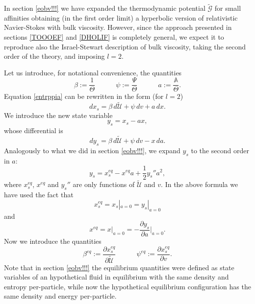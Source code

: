 \documentclass[useAMS,usenatbib,prd,twocolumn,nofootinbib]{revtex4-1}
\newcommand{\spc}{\quad \quad \quad}
\begin{document}
In section \ref{eobv!!!} we have expanded the thermodynamic potential $\tilde{\mathcal{G}}$ for small affinities obtaining (in the first order limit) a hyperbolic version of relativistic Navier-Stokes with bulk viscosity. 
However, since the approach presented in sections \ref{TOOOEF} and \ref{DHOLIF} is completely general, we expect it  to reproduce also the Israel-Stewart description of bulk viscosity, taking the second order of the theory, and imposing $l=2$.

Let us introduce, for notational convenience, the quantities
\begin{equation}\label{def...iciente}
\beta := \dfrac{1}{\Theta}  \spc  \psi := \dfrac{\Psi}{\Theta}  \spc  a := \dfrac{\mathbb{A}}{\Theta} .
\end{equation}
Equation \eqref{entrppia} can be rewritten in the form (for $l=2$)
\begin{equation}\label{entrppia111}
dx_s = \beta \, d\tilde{\mathcal{U}} + \psi \, d v +  a \, dx .
\end{equation}
We introduce the new state variable 
\begin{equation}\label{legg333}
y_s = x_s -ax ,
\end{equation}
whose differential is
\begin{equation}\label{54321}
dy_s = \beta \, d\tilde{\mathcal{U}} + \psi \, d v -  x \, da .
\end{equation}
Analogously to what we did in section \ref{eobv!!!}, we expand $y_s$ to the second order in $a$:
\begin{equation}\label{9876}
y_s = x_s^{eq} - x^{eq} a +\dfrac{1}{2} y_s'' a^2 , 
\end{equation}
where $x_s^{eq}$, $x^{eq}$ and $y_s''$ are only functions of $\tilde{\mathcal{U}}$ and $v$. In the above formula we have used the fact that
\begin{equation}
x_s^{eq} = x_s|_{a=0} = y_s|_{a=0}
\end{equation}
and
\begin{equation}
x^{eq} = x|_{a=0} = -\dfrac{\partial y_s}{\partial a} \bigg|_{a=0} .
\end{equation}
Now we introduce the quantities
\begin{equation}
\beta^{eq} := \dfrac{\partial x_s^{eq}}{\partial \tilde{\mathcal{U}}}  \spc  \psi^{eq} := \dfrac{\partial x_s^{eq}}{\partial v} .
\end{equation}
Note that in section \ref{eobv!!!} the equilibrium quantities were defined as state variables of an hypothetical fluid in equilibrium with the same density and entropy per-particle, while now the hypothetical equilibrium configuration has the same density and energy per-particle. 
\end{document}
